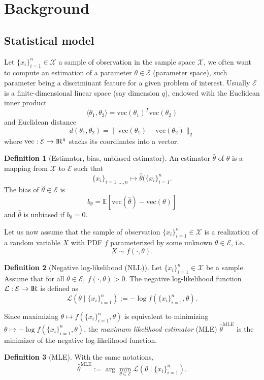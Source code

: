 \documentclass[10pt,a4paper]{book}
\theoremstyle{definition}
\newtheorem{defn}{Definition}[section]
\theoremstyle{plain}
\theoremstyle{remark}
\newcommand{\E}{\mathcal{E}}
\newcommand{\vecto}{\text{vec}}
\newcommand \Esp {\mathbb{E}}
\def\R{{\rm I\kern-0.16em R}}
\begin{document}
\section{Background}
\subsection{Statistical model}
Let $\{x_i\}_{i=1}^{n} \in \mathcal{X}$ a sample of observation in the sample space $\mathcal{X}$, we often want to compute an estimation of a  parameter $\theta \in \E$ (parameter space), such parameter being a discriminant feature for a given problem of interest. Usually $\E$ is a finite-dimensional linear space (say dimension $q$), endowed with the Euclidean inner product
$$\langle \theta_1,\theta_2\rangle=\vecto(\theta_1)^T \vecto(\theta_2)$$
and Euclidean distance
$$d(\theta_1,\theta_2)=\|\vecto(\theta_1)-\vecto(\theta_2)\|_2$$
where $\vecto:\E\to\R^{q}$ stacks its coordinates into a vector.
\begin{defn}[Estimator, bias, unbiased estimator]
An estimator $\hat{\theta}$ of $\theta$ is a mapping from $\mathcal{X}$ to $\E$ such that
$$\{x_i\}_{i=1,\dots, n} \mapsto \hat{\theta}(\{x_i\}_{i=1}^{n}.$$
The bias of $\hat{\theta}\in \E$ is
$$b_{\theta}=\Esp\left[\vecto(\hat{\theta})-\vecto(\theta)\right]$$ and $\hat{\theta}$ is unbiased if $b_{\theta}= 0$. 
\end{defn}

Let us now assume that the sample of observation $\{x_i\}_{i=1}^{n} \in \mathcal{X}$ is a realization of a random variable $X$ with PDF $f$ parameterized by some unknown $\theta \in \E$, i.e.
$$X\sim f(\cdot,\theta).$$
\begin{defn}[Negative log-likelihood (NLL)]
Let $\{x_i\}_{i=1}^{n} \in \mathcal{X}$ be a sample. Assume that for all $\theta \in \E,~f(\cdot,\theta)>0$. The negative log-likelihood function $\mathcal{L}:\E\to \R$ is defined as
$$\mathcal{L}(\theta \mid \{x_i\}_{i=1}^{n}):=-\log f(\{x_i\}_{i=1}^{n},\theta).$$
\end{defn}
Since maximizing $\theta \mapsto f(\{x_i\}_{i=1}^{n}, \theta)$ is equivalent to minimizing $\theta \mapsto -\log  f(\{x_i\}_{i=1}^{n},\theta)$, the \emph{maximum likelihood estimator} (MLE) $\hat{\theta}^{\text{MLE}}$ is the minimizer of the negative log-likelihood function.
\begin{defn}[MLE]
With the same notations, 
$$\hat{\theta}^{\text{MLE}}:=\arg \min_{\theta \in \E} \mathcal{L}(\theta \mid \{x_i\}_{i=1}^{n}).$$
\end{defn}
\end{document}
